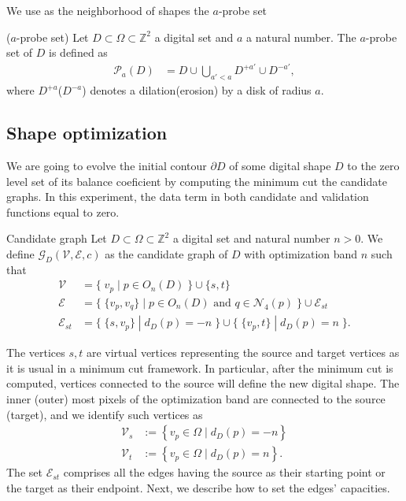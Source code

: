 \documentclass[runningheads]{llncs}
\newcommand{\daniel}[1]{ {\color{blue}#1} }
\newcommand{\Ds}{D}
\begin{document}
%
We use as the neighborhood of shapes the $a$-probe set
%
\begin{definition}{($a$-probe set)}
	Let $\Ds \subset \Omega \subset \mathbb{Z}^2$ a digital set and $a$ a natural number. The $a$-probe set of $\Ds$ is defined as
	\begin{align*}
		\mathcal{P}_a(\Ds) &= \Ds \cup \bigcup_{a' < a}{\Ds^{+a'} \cup \Ds^{-a'}},
	\end{align*}
	where $\Ds^{+a}$($\Ds^{-a}$) denotes a dilation(erosion) by a disk of radius $a$.
\end{definition}
%

\daniel{
\subsection{Shape optimization}
We are going to evolve the initial contour $\partial D$ of some digital shape $D$ to the zero level set of its balance coeficient by computing the minimum cut the candidate graphs. In this experiment, the data term in both candidate and validation functions equal to zero.}
%
\begin{definition}{Candidate graph}
Let $D \subset \Omega \subset \mathbb{Z}^2$ a digital set and natural number $n>0$. We define $\mathcal{G}_D(\mathcal{V},\mathcal{E},c)$ as the candidate graph of $D$ with optimization band $n$ such that
%
\begin{align*}
\mathcal{V} &= \big\{\; v_p \; | \; p \in O_n(D) \;\} \cup \{s,t \big\} \\
\mathcal{E} &= \big\{ \; \{v_p,v_q\} \; | \; p \in O_n(D) \text{ and } q \in \mathcal{N}_4(p) \; \big\} \cup \mathcal{E}_{st}\\
\mathcal{E}_{st} &= \big\{\; \{s,v_p\} \; | \; d_D(p)=-n \; \big\} \cup \big\{\; \{v_p,t\} \; | \; d_D(p)=n \; \big\}.
\end{align*}
%
\end{definition}

The vertices $s,t$ are virtual vertices representing the source and target vertices as it is usual in a minimum cut framework. In particular, after the minimum cut is computed, vertices connected to the source will define the new digital shape. The inner (outer) most pixels of the optimization band are connected to the source (target), and we identify such vertices as
%
\begin{align*}
	\mathcal{V}_s &:=\left\{ v_p \in \Omega \; | \; d_{D}(p) = -n \right\} \\
	\mathcal{V}_t &:=\left\{ v_p \in \Omega \; | \; d_{D}(p) = n \right\}.
\end{align*}
%
The set $\mathcal{E}_{st}$ comprises all the edges having the source as their starting point or the target as their endpoint. Next, we describe how to set the edges' capacities.
\end{document}
